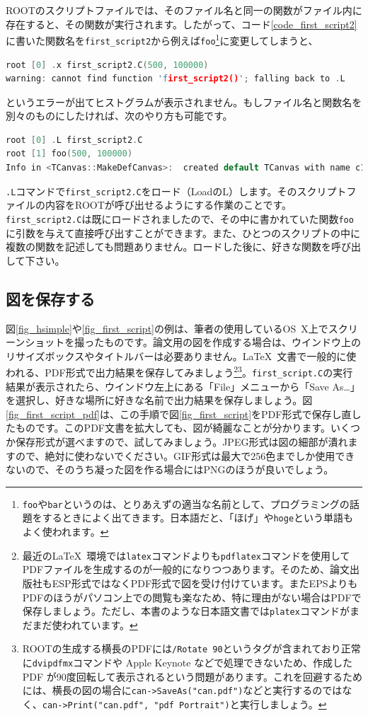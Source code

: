 ROOTのスクリプトファイルでは、そのファイル名と同一の関数がファイル内に存在すると、その関数が実行されます。したがって、コード\ref{code_first_script2}に書いた関数名を\texttt{first\_script2}から例えば\texttt{foo}\footnote{\texttt{foo}や\texttt{bar}というのは、とりあえずの適当な名前として、プログラミングの話題をするときによく出てきます。日本語だと、「ほげ」や\texttt{hoge}という単語もよく使われます。}に変更してしまうと、
\begin{lstlisting}[language=c++]
root [0] .x first_script2.C(500, 100000)
warning: cannot find function 'first_script2()'; falling back to .L
\end{lstlisting}
というエラーが出てヒストグラムが表示されません。もしファイル名と関数名を別々のものにしたければ、次のやり方も可能です。
\begin{lstlisting}[language=c++]
root [0] .L first_script2.C
root [1] foo(500, 100000)
Info in <TCanvas::MakeDefCanvas>:  created default TCanvas with name c1
\end{lstlisting}
\texttt{.L}コマンドで\texttt{first\_script2.C}をロード（LoadのL）します。そのスクリプトファイルの内容をROOTが呼び出せるようにする作業のことです。\texttt{first\_script2.C}は既にロードされましたので、その中に書かれていた関数\texttt{foo}に引数を与えて直接呼び出すことができます。また、ひとつのスクリプトの中に複数の関数を記述しても問題ありません。ロードした後に、好きな関数を呼び出して下さい。
\subsection{図を保存する}

図\ref{fig_hsimple}や\ref{fig_first_script}の例は、筆者の使用しているOS~X上でスクリーンショットを撮ったものです。論文用の図を作成する場合は、ウインドウ上のリサイズボックスやタイトルバーは必要ありません。\LaTeX\ 文書で一般的に使われる、PDF形式で出力結果を保存してみましょう\footnote{最近の\LaTeX\ 環境では\texttt{latex}コマンドよりも\texttt{pdflatex}コマンドを使用してPDFファイルを生成するのが一般的になりつつあります。そのため、論文出版社もESP形式ではなくPDF形式で図を受け付けています。またEPSよりもPDFのほうがパソコン上での閲覧も楽なため、特に理由がない場合はPDFで保存しましょう。ただし、本書のような日本語文書では\texttt{platex}コマンドがまだまだ使われています。}\footnote{ROOTの生成する横長のPDFには\texttt{/Rotate 90}というタグが含まれており正常に\texttt{dvipdfmx}コマンドや Apple Keynote などで処理できないため、作成した PDF が90度回転して表示されるという問題があります。これを回避するためには、横長の図の場合に\texttt{can->SaveAs("can.pdf")}などと実行するのではなく、\texttt{can->Print("can.pdf", "pdf Portrait")}と実行しましょう。}。\texttt{first\_script.C}の実行結果が表示されたら、ウインドウ左上にある「File」メニューから「Save As\ldots」を選択し、好きな場所に好きな名前で出力結果を保存しましょう。図\ref{fig_first_script_pdf}は、この手順で図\ref{fig_first_script}をPDF形式で保存し直したものです。このPDF文書を拡大しても、図が綺麗なことが分かります。いくつか保存形式が選べますので、試してみましょう。JPEG形式は図の細部が潰れますので、絶対に使わないでください。GIF形式は最大で256色までしか使用できないので、そのうち凝った図を作る場合にはPNGのほうが良いでしょう。

